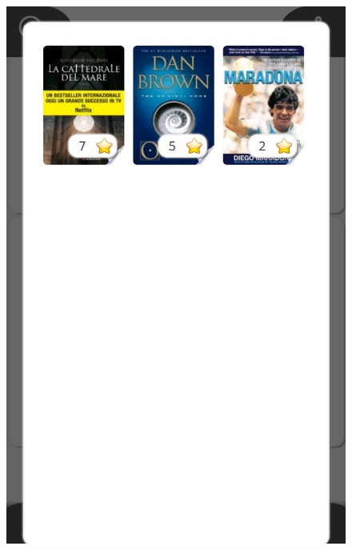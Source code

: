 \begin{figure}[H]
	\hspace{0.5cm}
	\includegraphics[scale=0.15]{Images/UI/Profile/2}
	\hspace{0.5cm}

\end{figure}
